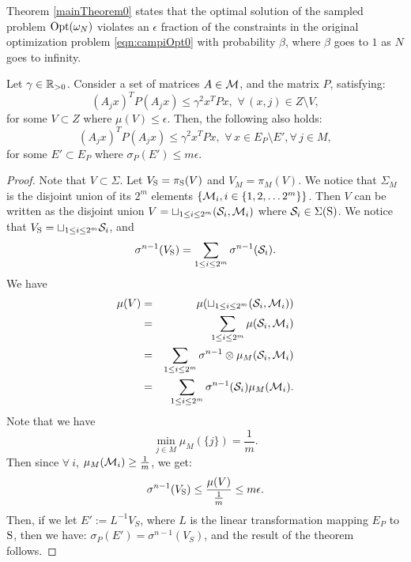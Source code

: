 Theorem \ref{mainTheorem0} states that the optimal solution of the sampled problem $\text{Opt}(\omega_N)$ violates an $\epsilon$ fraction of the constraints in the original optimization problem  \eqref{eqn:campiOpt0} with probability $\beta$, where $\beta$ goes to $1$ as $N$ goes to infinity.



\begin{theorem}\label{thm:mainTheorem01}Let $\gamma \in \mathbb{R}_{> 0}$. Consider a set of matrices $A \in \mathcal{M}$, and the matrix $P$, satisfying:
\begin{equation*}(A_j x)^TP(A_j x) \leq {\gamma}^2x^TPx,\,\, \forall\, (x, j) \in Z \setminus V,\end{equation*}
for some $V \subset Z$ where $\mu(V) \leq \epsilon$. Then, the following also holds:
\begin{equation*}\label{eqn:thm01-2}(A_j x)^TP(A_j x) \leq {\gamma}^2x^TPx,\,\, \forall\, x \in E_P \setminus E', \forall\, j \in M,\end{equation*}
for some $E' \subset E_P$ where $\sigma_P(E') \leq m\epsilon$.
\end{theorem}

\begin{proof}
Note that $V \subset \Sigma$. Let $V_{\text{S}} = \pi_{\text{S}}(V)$ and $V_M = \pi_M (V)$. We notice that $\Sigma_M$ is the disjoint union of its $2^m$ elements $\{\mathcal{M}_i, i \in \{1,2, \ldots 2^m\} \}$. Then $V$ can be written as the disjoint union $V = \sqcup_{1 \leq i \leq 2^m} (\mathcal{S}_i, \mathcal{M}_i)$ where $\mathcal{S}_i \in \Sigma(\text{S})$. We notice that 
$V_{\text{S}} = \sqcup_{1 \leq i \leq 2^m} \mathcal{S}_i$, 
and
\begin{equation*}
\sigma^{n-1} (V_{\text{S}}) = \sum_{1 \leq i \leq 2^m} \sigma^{n-1} (\mathcal{S}_i).
\end{equation*}
We have 
\begin{eqnarray*}
\mu(V) &=& \mu(\sqcup_{1 \leq i \leq 2^m} (\mathcal{S}_i, \mathcal{M}_i)) \\
&=& \sum_{1 \leq i \leq 2^m} \mu(\mathcal{S}_i, \mathcal{M}_i) \\
 &=& \sum_{1 \leq i \leq 2^m} \sigma^{n-1} \otimes \mu_M (\mathcal{S}_i, \mathcal{M}_i) \\
 & = &\sum_{1 \leq i \leq 2^m} \sigma^{n-1}(\mathcal{S}_i) \mu_M (\mathcal{M}_i).
\end{eqnarray*}
Note that we have $$\min_{j \in M} \mu_M(\{j\}) = \frac{1}{m}.$$ Then since $ \forall \ i$, $\mu_M(\mathcal{M}_i) \geq \frac{1}{m}$, we get:
\begin{equation}
\sigma^{n-1}(V_{\text{S}}) \leq \frac{\mu(V)}{\frac{1}{m}} \leq m \epsilon.
\end{equation}
Then, if we let $E':=L^{-1} V_S$, where $L$ is the linear transformation mapping $E_P$ to $\text{S}$, then we have: $\sigma_P(E') = \sigma^{n-1}(V_S)$, and the result of the theorem follows.
\end{proof}


